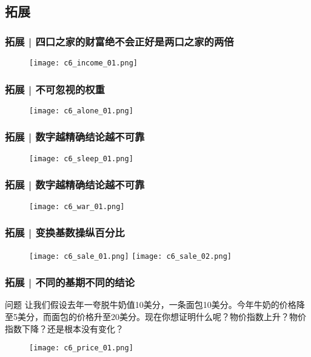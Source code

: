 \subsection{拓展}
\begin{frame}
  \frametitle{拓展 | 四口之家的财富绝不会正好是两口之家的两倍}
  \begin{figure}
    \centering
    \texttt{[image: c6\_income\_01.png]}
  \end{figure}
\end{frame}

\begin{frame}
  \frametitle{拓展 | 不可忽视的权重}
  \begin{figure}
    \centering
    \texttt{[image: c6\_alone\_01.png]}
  \end{figure}
\end{frame}

\begin{frame}
  \frametitle{拓展 | 数字越精确结论越不可靠}
  \begin{figure}
    \centering
    \texttt{[image: c6\_sleep\_01.png]}
  \end{figure}
\end{frame}

\begin{frame}
  \frametitle{拓展 | 数字越精确结论越不可靠}
  \begin{figure}
    \centering
    \texttt{[image: c6\_war\_01.png]}
  \end{figure}
\end{frame}

\begin{frame}
  \frametitle{拓展 | 变换基数操纵百分比}
  \begin{figure}
    \centering
    \texttt{[image: c6\_sale\_01.png]}\quad
    \texttt{[image: c6\_sale\_02.png]}
  \end{figure}
\end{frame}

\begin{frame}
  \frametitle{拓展 | 不同的基期不同的结论}
  \begin{block}{问题}
让我们假设去年一夸脱牛奶值10美分，一条面包10美分。今年牛奶的价格降至5美分，而面包的价格升至20美分。现在你想证明什么呢？物价指数上升？物价指数下降？还是根本没有变化？
  \end{block}
  \begin{figure}
    \centering
    \texttt{[image: c6\_price\_01.png]}
  \end{figure}
\end{frame}

